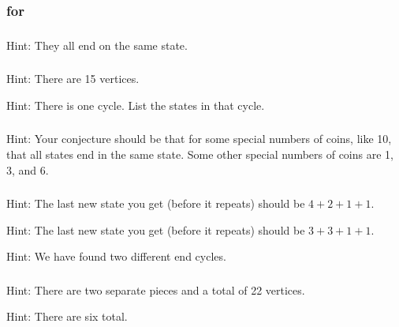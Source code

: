 \subsubsection{\answers for 
\subbulgsol}

\subsubsection*{ \answers}
Hint: They all end on the same state.

\subsubsection*{ \answers}
\begin{apart}
    \item Hint: There are 15 vertices.
    \item Hint: There is one cycle.  List the states in that cycle.
\end{apart}

\subsubsection*{ \answers}
Hint: Your conjecture should be that for some special numbers of coins, like 10, that all states end in the same state.  Some other special numbers of coins are 1, 3, and 6.

\subsubsection*{ \answers}
\begin{apart}
    \item Hint: The last new state you get (before it repeats) should be $4+2+1+1$.
    \item Hint: The last new state you get (before it repeats) should be $3+3+1+1$.
    \item Hint: We have found two different end cycles.  
\end{apart}

\subsubsection*{ \answers}
\begin{apart}
    \item Hint: There are two separate pieces and a total of 22 vertices.
    \item Hint: There are six total.
\end{apart}

